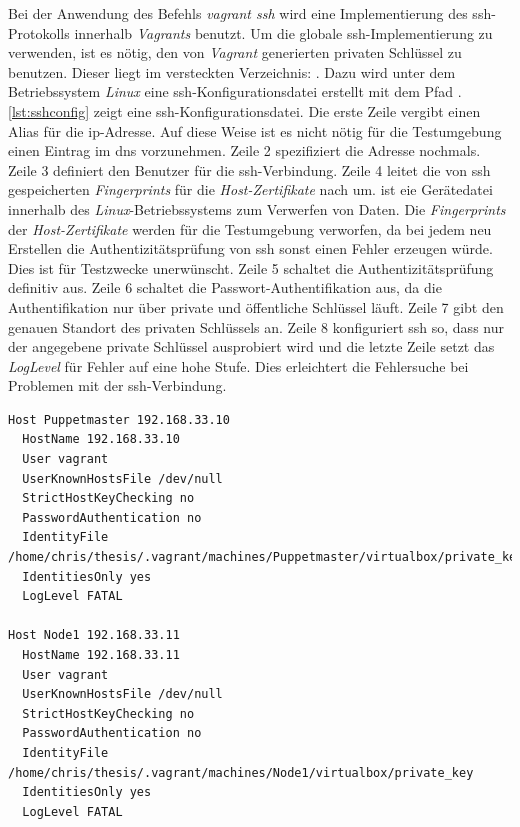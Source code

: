 \documentclass[titlepage]{report}
\begin{document}
Bei der Anwendung des Befehls \emph{vagrant ssh} wird eine
Implementierung des \gls{ssh}\hyp{}Protokolls innerhalb \emph{Vagrants} benutzt. Um
die globale \gls{ssh}\hyp{}Implementierung zu verwenden, ist es nötig, den
von \emph{Vagrant} generierten privaten Schlüssel zu benutzen. Dieser
liegt im versteckten Verzeichnis: . Dazu wird unter dem Betriebssystem
\emph{Linux} eine \gls{ssh}\hyp{}Konfigurationsdatei erstellt mit dem Pfad
. \autoref{lst:sshconfig} zeigt
eine \gls{ssh}\hyp{}Konfigurationsdatei. Die erste Zeile vergibt einen
Alias für die \gls{ip}\hyp{}Adresse. Auf diese Weise ist es nicht nötig
für die Testumgebung einen Eintrag im \gls{dns} vorzunehmen. Zeile 2
spezifiziert die Adresse nochmals. Zeile 3 definiert den Benutzer für
die \gls{ssh}\hyp{}Verbindung. Zeile 4 leitet die von \gls{ssh}
gespeicherten \emph{Fingerprints} für die \emph{Host-Zertifikate} nach
 um.  ist eie Gerätedatei innerhalb des
\emph{Linux}\hyp{}Betriebssystems zum Verwerfen von Daten\cite{DEVNULL}. Die
\emph{Fingerprints} der \emph{Host-Zertifikate} werden für die
Testumgebung verworfen, da bei jedem neu Erstellen die
Authentizitätsprüfung von \gls{ssh} sonst einen Fehler erzeugen würde.
Dies ist für Testzwecke unerwünscht. Zeile 5 schaltet die
Authentizitätsprüfung definitiv aus. Zeile 6 schaltet die
Passwort\hyp{}Authentifikation aus, da die Authentifikation nur über
private und öffentliche Schlüssel läuft. Zeile 7 gibt den
genauen Standort des privaten Schlüssels an. Zeile 8 konfiguriert
\gls{ssh} so, dass nur der angegebene private Schlüssel ausprobiert
wird und die letzte Zeile setzt das \emph{LogLevel} für Fehler auf eine
hohe Stufe. Dies erleichtert die Fehlersuche bei Problemen mit der
\gls{ssh}\hyp{}Verbindung.
\begin{minipage}{\linewidth}
\begin{lstlisting}[caption={Beispiel einer SSH Konfigurationsdatei},label={lst:sshconfig}]
Host Puppetmaster 192.168.33.10
  HostName 192.168.33.10
  User vagrant
  UserKnownHostsFile /dev/null
  StrictHostKeyChecking no
  PasswordAuthentication no
  IdentityFile /home/chris/thesis/.vagrant/machines/Puppetmaster/virtualbox/private_key
  IdentitiesOnly yes
  LogLevel FATAL

Host Node1 192.168.33.11
  HostName 192.168.33.11
  User vagrant
  UserKnownHostsFile /dev/null
  StrictHostKeyChecking no
  PasswordAuthentication no
  IdentityFile /home/chris/thesis/.vagrant/machines/Node1/virtualbox/private_key
  IdentitiesOnly yes
  LogLevel FATAL
\end{lstlisting}
\end{minipage}
\end{document}
